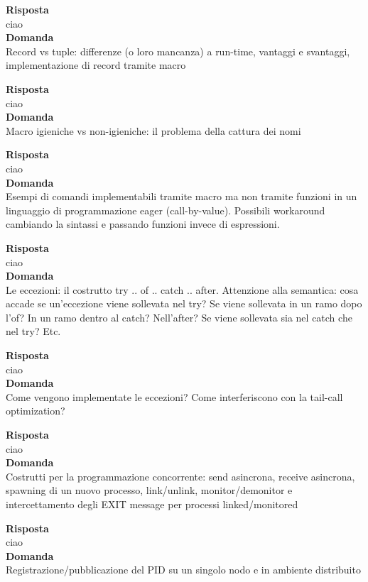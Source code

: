 \documentclass{article}
\begin{document}
\textbf{Risposta}\\
ciao
\vspace{14pt}\\
\textbf{Domanda}\\
Record vs tuple: differenze (o loro mancanza) a run-time, vantaggi e svantaggi, implementazione di record tramite macro

\textbf{Risposta}\\
ciao
\vspace{14pt}\\
\textbf{Domanda}\\
Macro igieniche vs non-igieniche: il problema della cattura dei nomi

\textbf{Risposta}\\
ciao
\vspace{14pt}\\
\textbf{Domanda}\\
Esempi di comandi implementabili tramite macro ma non tramite funzioni in un linguaggio di programmazione eager (call-by-value). Possibili workaround cambiando la sintassi e passando funzioni invece di espressioni.

\textbf{Risposta}\\
ciao
\vspace{14pt}\\
\textbf{Domanda}\\
Le eccezioni: il costrutto try .. of .. catch .. after. Attenzione alla semantica: cosa accade se un'eccezione viene sollevata nel try? Se viene sollevata in un ramo dopo l'of? In un ramo dentro al catch? Nell'after? Se viene sollevata sia nel catch che nel try? Etc.

\textbf{Risposta}\\
ciao
\vspace{14pt}\\
\textbf{Domanda}\\
Come vengono implementate le eccezioni? Come interferiscono con la tail-call optimization?

\textbf{Risposta}\\
ciao
\vspace{14pt}\\
\textbf{Domanda}\\
Costrutti per la programmazione concorrente: send asincrona, receive asincrona, spawning di un nuovo processo, link/unlink, monitor/demonitor e intercettamento degli EXIT message per processi linked/monitored

\textbf{Risposta}\\
ciao
\vspace{14pt}\\
\textbf{Domanda}\\
Registrazione/pubblicazione del PID su un singolo nodo e in ambiente distribuito
\end{document}
